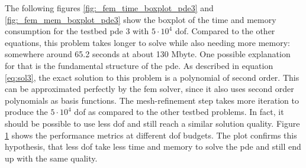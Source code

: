 \documentclass[./\jobname.tex]{subfiles}
\begin{document}
The following figures \ref{fig:_fem_time_boxplot_pde3} and \ref{fig:_fem_mem_boxplot_pde3} show the boxplot of the time and memory consumption for the testbed \gls{pde} 3 with $5 \cdot 10^4$ \gls{dof}. Compared to the other equations, this problem takes longer to solve while also needing more memory: somewhere around 65.2 seconds at about 130 Mbyte. One possible explanation for that is the fundamental structure of the \gls{pde}. As described in equation \eqref{eq:sol3}, the exact solution to this problem is a polynomial of second order. This can be approximated perfectly by the \gls{fem} solver, since it also uses second order polynomials as basis functions. The mesh-refinement step takes more iteration to produce the $5 \cdot 10^4$ \gls{dof} as compared to the other testbed problems. In fact, it should be possible to use less \gls{dof} and still reach a similar solution quality. Figure \ref{fig:_dof_sweep_pde3} shows the performance metrics at different \gls{dof} budgets. The plot confirms this hypothesis, that less \gls{dof} take less time and memory to solve the \gls{pde} and still end up with the same quality. 

\begin{figure}[H]
	\centering
	\noindent{}
	\label{fig:_dof_sweep_pde3}
\end{figure}
\end{document}
